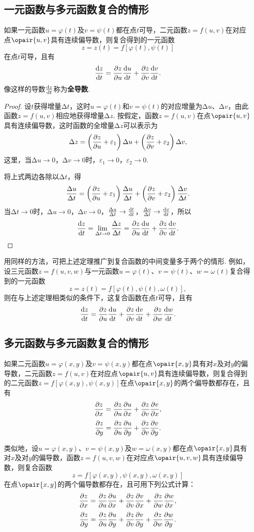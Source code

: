 \subsection{一元函数与多元函数复合的情形}
\begin{theorem}
如果一元函数\(u=\varphi(t)\)及\(v=\psi(t)\)都在点\(t\)可导，二元函数\(z=f(u,v)\)在对应点\(\opair{u,v}\)具有连续偏导数，则复合得到的一元函数\[
z = z(t) = f[\varphi(t),\psi(t)]
\]在点\(t\)可导，且有\[
\dv{z}{t} = \pdv{z}{u}\dv{u}{t} + \pdv{z}{v}\dv{v}{t}.
\]
像这样的导数\(\dv{z}{t}\)称为\textbf{全导数}.
\begin{proof}
\def\D#1#2{\frac{\increment #1}{\increment #2}}
设\(t\)获得增量\(\increment t\)，这时\(u=\varphi(t)\)和\(v=\psi(t)\)的对应增量为\(\increment u\)、\(\increment v\)，由此函数\(z=f(u,v)\)相应地获得增量\(\increment z\).
按假定，函数\(z=f(u,v)\)在点\(\opair{u,v}\)具有连续偏导数，这时函数的全增量\(\increment z\)可以表示为
\[
\Delta z = \left(\pdv{z}{u} + \varepsilon_1\right) \Delta u + \left(\pdv{z}{v} + \varepsilon_2\right) \Delta v,
\]这里，当\(\increment u\to0\)，\(\increment v\to0\)时，\(\varepsilon_1\to0\)，\(\varepsilon_2\to0\).

将上式两边各除以\(\increment t\)，得\[
\D{u}{t} = \left(\pdv{z}{u} + \varepsilon_1\right) \D{u}{t} + \left(\pdv{z}{v} + \varepsilon_2\right) \D{v}{t}.
\]当\(\increment t\to0\)时，\(\increment u\to0\)，\(\increment v\to0\)，\(\D{u}{t} \to \dv{t}{t}\)，\(\D{v}{t} \to \dv{v}{t}\)，所以\[
\dv{z}{t} = \lim\limits_{\increment t\to0}{\D{z}{t}}
= \pdv{z}{u} \dv{u}{t} + \pdv{z}{v} \dv{v}{t}.
\qedhere
\]
\end{proof}
\end{theorem}
用同样的方法，可把上述定理推广到复合函数的中间变量多于两个的情形.
例如，设三元函数\(z=f(u,v,w)\)与一元函数\(u=\varphi(t)\)、\(v=\psi(t)\)、\(w=\omega(t)\)复合得到的一元函数\[
z = z(t) = f[\varphi(t),\psi(t),\omega(t)],
\]则在与上述定理相类似的条件下，这复合函数在点\(t\)可导，且有\[
\dv{z}{t} = \pdv{z}{u}\dv{u}{t} + \pdv{z}{v}\dv{v}{t} + \pdv{z}{w}\dv{w}{t}.
\]

\subsection{多元函数与多元函数复合的情形}
\begin{theorem}
如果二元函数\(u=\varphi(x,y)\)及\(v=\psi(x,y)\)都在点\(\opair{x,y}\)具有对\(x\)及对\(y\)的偏导数，二元函数\(z=f(u,v)\)在对应点\(\opair{u,v}\)具有连续偏导数，则复合得到的二元函数\(z=f[\varphi(x,y),\psi(x,y)]\)在点\(\opair{x,y}\)的两个偏导数都存在，且有\[
\pdv{z}{x} = \pdv{z}{u}\pdv{u}{x} + \pdv{z}{v}\pdv{v}{x},
\]\[
\pdv{z}{y} = \pdv{z}{u}\pdv{u}{y} + \pdv{z}{v}\pdv{v}{y}.
\]
\end{theorem}
类似地，设\(u=\varphi(x,y)\)、\(v=\psi(x,y)\)及\(w=\omega(x,y)\)都在点\(\opair{x,y}\)具有对\(x\)及对\(y\)的偏导数，函数\(z=f(u,v,w)\)在对应点\(\opair{u,v,w}\)具有连续偏导数，则复合函数\[
z = f[\varphi(x,y),\psi(x,y),\omega(x,y)]
\]在点\(\opair{x,y}\)的两个偏导数都存在，且可用下列公式计算：\[
\pdv{z}{x} = \pdv{z}{u}\pdv{u}{x} + \pdv{z}{v}\pdv{v}{x} + \pdv{z}{w}\pdv{w}{x},
\]\[
\pdv{z}{y} = \pdv{z}{u}\pdv{u}{y} + \pdv{z}{v}\pdv{v}{y} + \pdv{z}{w}\pdv{w}{y}.
\]

